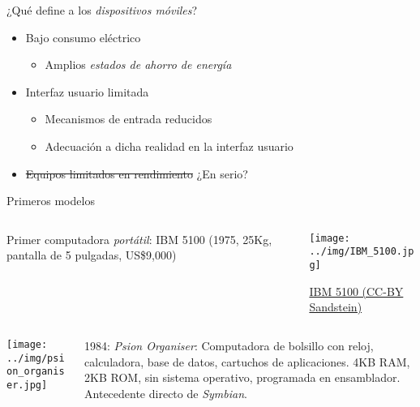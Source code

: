 \documentclass[presentation]{beamer}
\begin{document}
\begin{frame}[label={sec:org2ce7d29}]{¿Qué define a los \emph{dispositivos móviles}?}
\begin{itemize}
\item Bajo consumo eléctrico
\begin{itemize}
\item Amplios \emph{estados de ahorro de energía}
\end{itemize}
\item Interfaz usuario limitada
\begin{itemize}
\item Mecanismos de entrada reducidos
\item Adecuación a dicha realidad en la interfaz usuario
\end{itemize}
\item \sout{Equipos limitados en rendimiento} \pause ¿En serio?
\end{itemize}
\end{frame}

\begin{frame}[label={sec:org39bef31}]{Primeros modelos}
\begin{columns} \begin{column}{0.7\textwidth}
Primer computadora \emph{portátil}: IBM 5100 (1975, 25Kg, pantalla de 5
pulgadas, US\$9,000)
\end{column} \begin{column}{0.3\textwidth}
\begin{center}
\texttt{[image: ../img/IBM\_5100.jpg]}
\end{center}
{\tiny \href{https://commons.wikimedia.org/w/index.php?curid=16332671}{IBM 5100 (CC-BY Sandstein)}}
\end{column} \end{columns}

\begin{columns} \begin{column}{0.15\textwidth}
\begin{center}
\texttt{[image: ../img/psion\_organiser.jpg]}
\end{center}
\end{column} \begin{column}{0.8\textwidth}
1984: \emph{Psion Organiser}: Computadora de bolsillo con reloj,
calculadora, base de datos, cartuchos de aplicaciones.  4KB RAM, 2KB
ROM, sin sistema operativo, programada en ensamblador. Antecedente
directo de \emph{Symbian}.
\end{column} \end{columns}
\end{frame}
\end{document}
